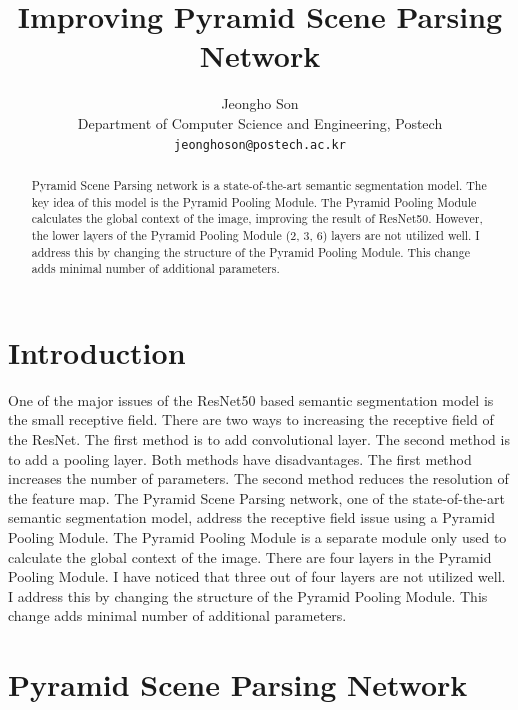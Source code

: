 \documentclass[10pt,twocolumn,letterpaper]{article}
\begin{document}
\title{Improving Pyramid Scene Parsing Network}

\author{
  Jeongho Son\\
  Department of Computer Science and Engineering, Postech\\
  {\tt\small jeonghoson@postech.ac.kr}
}

\maketitle

\begin{abstract}
  Pyramid Scene Parsing network\cite{zhao2017pyramid} is a state-of-the-art semantic segmentation model. The key idea of this model is the Pyramid Pooling Module. The Pyramid Pooling Module calculates the global context of the image, improving the result of ResNet50\cite{he2015deep}. However, the lower layers of the Pyramid Pooling Module (2, 3, 6) layers are not utilized well. I address this by changing the structure of the Pyramid Pooling Module. This change adds minimal number of additional parameters.
\end{abstract}

\section{Introduction}
\label{sec:intro}

One of the major issues of the ResNet50 based semantic segmentation model is the small receptive field. There are two ways to increasing the receptive field of the ResNet. The first method is to add convolutional layer. The second method is to add a pooling layer. Both methods have disadvantages. The first method increases the number of parameters. The second method reduces the resolution of the feature map. The Pyramid Scene Parsing network\cite{zhao2017pyramid}, one of the state-of-the-art semantic segmentation model, address the receptive field issue using a Pyramid Pooling Module. The Pyramid Pooling Module is a separate module only used to calculate the global context of the image. There are four layers in the Pyramid Pooling Module. I have noticed that three out of four layers are not utilized well. I address this by changing the structure of the Pyramid Pooling Module. This change adds minimal number of additional parameters.

\section{Pyramid Scene Parsing Network}
\label{sec:PSPNet}
\end{document}
